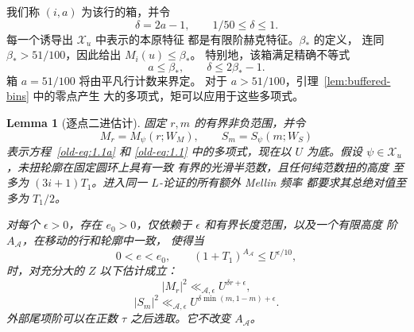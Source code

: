 \documentclass[11pt,a4paper]{article}
\numberwithin{equation}{section}
\numberwithin{figure}{section}
\newtheorem{lemma}[theorem]{Lemma}
\theoremstyle{definition}
\theoremstyle{remark}
\begin{document}
我们称 \((i,a)\) 为该行的箱，并令
\[
 \delta=2a-1,\qquad 1/50\le\delta\le1.
\]
每一个诱导出 \(\mathcal X_u\) 中表示的本原特征
都是有限阶赫克特征。\(\beta_*\) 的定义，
连同 \(\beta_*>51/100\)，因此给出 \(M_i(u)\le\beta_*\)。
特别地，该箱满足精确不等式
\[
 a\le\beta_*,\qquad \delta\le2\beta_*-1.
\]
箱 \(a=51/100\) 将由平凡行计数来界定。
对于 \(a>51/100\)，引理~\ref{lem:buffered-bins} 中的零点产生
大的多项式，矩可以应用于这些多项式。

\begin{lemma}[逐点二进估计]\label{lem:detector-dyads}
固定 \(r,m\) 的有界非负范围，并令
\[
 M_r=M_\psi(r;W_M),\qquad S_m=S_\psi(m;W_S)
\]
表示方程~\eqref{old-eq:1.1a} 和
\eqref{old-eq:1.1} 中的多项式，现在以 \(U\) 为底。假设
\(\psi\in\mathcal X_u\)，未扭轮廓在固定圆环上具有一致
有界的光滑半范数，且任何纯范数扭的高度
至多为 \((3i+1)T_1\)。进入同一 \(L\)-论证的所有额外 Mellin 频率
都要求其总绝对值至多为 \(T_1/2\)。

对每个 \(\epsilon>0\)，存在 \(e_0>0\)，仅依赖于
\(\epsilon\) 和有界长度范围，以及一个有限高度
阶 \(A_{\mathcal A}\)，在移动的行和轮廓中一致，
使得当
\[
 0<e<e_0,\qquad (1+T_1)^{A_{\mathcal A}}\le U^{\epsilon/10},
\]
时，对充分大的 \(Z\) 以下估计成立：
\begin{equation}
 |M_r|^2\ll_{\mathcal A,\epsilon}U^{\delta r+\epsilon},
 \label{old-eq:6.2}
\end{equation}
\begin{equation}
 |S_m|^2\ll_{\mathcal A,\epsilon}
       U^{\delta\min(m,1-m)+\epsilon}.
 \label{old-eq:6.3}
\end{equation}
外部尾项阶可以在正数
\(\tau\) 之后选取。它不改变 \(A_{\mathcal A}\)。
\end{lemma}
\end{document}
